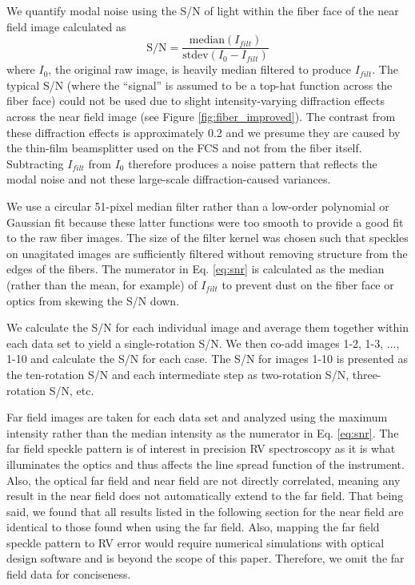 \documentclass[twocolumn]{emulateapj}
\begin{document}
We quantify modal noise using the S/N of light within the fiber face of the near field image calculated as
\begin{equation}
\mathrm{S/N} = \frac{\mathrm{median}(I_{filt})}{\mathrm{stdev}(I_0 - I_{filt})}
\label{eq:snr}
\end{equation}
where $I_0$, the original raw image, is heavily median filtered to produce $I_{filt}$. The typical S/N (where the ``signal'' is assumed to be a top-hat function across the fiber face) could not be used due to slight intensity-varying diffraction effects across the near field image (see Figure \ref{fig:fiber_improved}). The contrast from these diffraction effects is approximately 0.2 and we presume they are caused by the thin-film beamsplitter used on the FCS and not from the fiber itself. Subtracting $I_{filt}$ from $I_0$ therefore produces a noise pattern that reflects the modal noise and not these large-scale diffraction-caused variances.

We use a circular 51-pixel median filter rather than a low-order polynomial or Gaussian fit because these latter functions were too smooth to provide a good fit to the raw fiber images. The size of the filter kernel was chosen such that speckles on unagitated images are sufficiently filtered without removing structure from the edges of the fibers. The numerator in Eq. \ref{eq:snr} is calculated as the median (rather than the mean, for example) of $I_{filt}$ to prevent dust on the fiber face or optics from skewing the S/N down.

We calculate the S/N for each individual image and average them together within each data set to yield a single-rotation S/N. We then co-add images 1-2, 1-3, ..., 1-10 and calculate the S/N for each case. The S/N for images 1-10 is presented as the ten-rotation S/N and each intermediate step as two-rotation S/N, three-rotation S/N, etc.

Far field images are taken for each data set and analyzed using the maximum intensity rather than the median intensity as the numerator in Eq. \ref{eq:snr}. The far field speckle pattern is of interest in precision RV spectroscopy as it is what illuminates the optics and thus affects the line spread function of the instrument. Also, the optical far field and near field are not directly correlated, meaning any result in the near field does not automatically extend to the far field. That being said, we found that all results listed in the following section for the near field are identical to those found when using the far field. Also, mapping the far field speckle pattern to RV error would require numerical simulations with optical design software and is beyond the scope of this paper. Therefore, we omit the far field data for conciseness.
\end{document}
